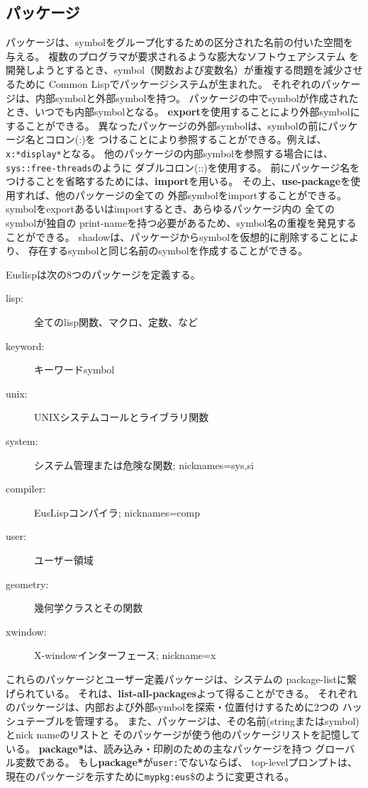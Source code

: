 \subsection{パッケージ}

パッケージは、symbolをグループ化するための区分された名前の付いた空間を与える。
複数のプログラマが要求されるような膨大なソフトウェアシステム
を開発しようとするとき、symbol（関数および変数名）が重複する問題を減少させるために
Common Lispでパッケージシステムが生まれた。
それぞれのパッケージは、内部symbolと外部symbolを持つ。
パッケージの中でsymbolが作成されたとき、いつでも内部symbolとなる。
{\bf export}を使用することにより外部symbolにすることができる。
異なったパッケージの外部symbolは、symbolの前にパッケージ名とコロン(:)を
つけることにより参照することができる。例えば、{\tt x:*display*}となる。
他のパッケージの内部symbolを参照する場合には、{\tt sys::free-threads}のように
ダブルコロン(::)を使用する。
前にパッケージ名をつけることを省略するためには、{\bf import}を用いる。
その上、{\bf use-package}を使用すれば、他のパッケージの全ての
外部symbolをimportすることができる。
symbolをexportあるいはimportするとき、あらゆるパッケージ内の
全てのsymbolが独自の
print-nameを持つ必要があるため、symbol名の重複を発見することができる。
{\bfx shadow}は、パッケージからsymbolを仮想的に削除することにより、
存在するsymbolと同じ名前のsymbolを作成することができる。

Euslispは次の8つのパッケージを定義する。
\begin{description}
\item [lisp:] 全てのlisp関数、マクロ、定数、など
\item [keyword:] キーワードsymbol
\item [unix:] UNIXシステムコールとライブラリ関数
\item [system:] システム管理または危険な関数; nicknames=sys,si
\item [compiler:] EusLispコンパイラ; nicknames=comp
\item [user:] ユーザー領域
\item [geometry:] 幾何学クラスとその関数
\item [xwindow:] X-windowインターフェース; nickname=x
\end{description}

これらのパッケージとユーザー定義パッケージは、システムの
package-listに繋げられている。
それは、{\bf list-all-packages}よって得ることができる。
それぞれのパッケージは、内部および外部symbolを探索・位置付けするために2つの
ハッシュテーブルを管理する。
また、パッケージは、その名前(stringまたはsymbol)とnick nameのリストと
そのパッケージが使う他のパッケージリストを記憶している。
{\bf *package*}は、読み込み・印刷のための主なパッケージを持つ
グローバル変数である。
もし{\bf *package*}が{\tt user:}でないならば、
top-levelプロンプトは、現在のパッケージを示すために{\tt mypkg:eus}\$のように変更される。

